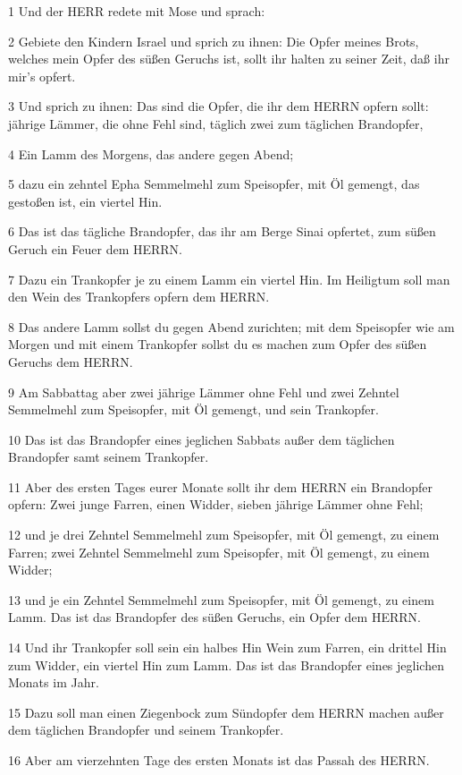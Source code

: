 \par 1 Und der HERR redete mit Mose und sprach:
\par 2 Gebiete den Kindern Israel und sprich zu ihnen: Die Opfer meines Brots, welches mein Opfer des süßen Geruchs ist, sollt ihr halten zu seiner Zeit, daß ihr mir's opfert.
\par 3 Und sprich zu ihnen: Das sind die Opfer, die ihr dem HERRN opfern sollt: jährige Lämmer, die ohne Fehl sind, täglich zwei zum täglichen Brandopfer,
\par 4 Ein Lamm des Morgens, das andere gegen Abend;
\par 5 dazu ein zehntel Epha Semmelmehl zum Speisopfer, mit Öl gemengt, das gestoßen ist, ein viertel Hin.
\par 6 Das ist das tägliche Brandopfer, das ihr am Berge Sinai opfertet, zum süßen Geruch ein Feuer dem HERRN.
\par 7 Dazu ein Trankopfer je zu einem Lamm ein viertel Hin. Im Heiligtum soll man den Wein des Trankopfers opfern dem HERRN.
\par 8 Das andere Lamm sollst du gegen Abend zurichten; mit dem Speisopfer wie am Morgen und mit einem Trankopfer sollst du es machen zum Opfer des süßen Geruchs dem HERRN.
\par 9 Am Sabbattag aber zwei jährige Lämmer ohne Fehl und zwei Zehntel Semmelmehl zum Speisopfer, mit Öl gemengt, und sein Trankopfer.
\par 10 Das ist das Brandopfer eines jeglichen Sabbats außer dem täglichen Brandopfer samt seinem Trankopfer.
\par 11 Aber des ersten Tages eurer Monate sollt ihr dem HERRN ein Brandopfer opfern: Zwei junge Farren, einen Widder, sieben jährige Lämmer ohne Fehl;
\par 12 und je drei Zehntel Semmelmehl zum Speisopfer, mit Öl gemengt, zu einem Farren; zwei Zehntel Semmelmehl zum Speisopfer, mit Öl gemengt, zu einem Widder;
\par 13 und je ein Zehntel Semmelmehl zum Speisopfer, mit Öl gemengt, zu einem Lamm. Das ist das Brandopfer des süßen Geruchs, ein Opfer dem HERRN.
\par 14 Und ihr Trankopfer soll sein ein halbes Hin Wein zum Farren, ein drittel Hin zum Widder, ein viertel Hin zum Lamm. Das ist das Brandopfer eines jeglichen Monats im Jahr.
\par 15 Dazu soll man einen Ziegenbock zum Sündopfer dem HERRN machen außer dem täglichen Brandopfer und seinem Trankopfer.
\par 16 Aber am vierzehnten Tage des ersten Monats ist das Passah des HERRN.
